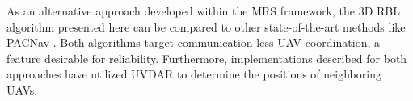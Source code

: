 
        
        As an alternative approach developed within the \ac{MRS} framework, the 3D \ac{RBL} algorithm presented here can be compared to other state-of-the-art methods like PACNav \cite{PACNav}. 
        Both algorithms target communication-less \ac{UAV} coordination, a feature desirable for reliability. 
        Furthermore, implementations described for both approaches have utilized UVDAR to determine the positions of neighboring \ac{UAV}s.

